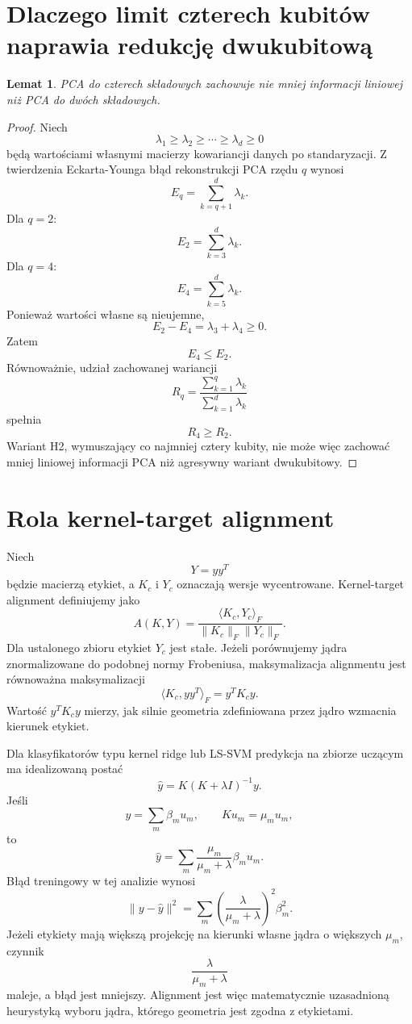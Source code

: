 \documentclass[11pt,a4paper]{article}
\newtheorem{lemma}{Lemat}
\begin{document}
\section{Dlaczego limit czterech kubitów naprawia redukcję dwukubitową}

\begin{lemma}
PCA do czterech składowych zachowuje nie mniej informacji liniowej niż PCA do dwóch składowych.
\end{lemma}

\begin{proof}
Niech
\[
\lambda_1\ge \lambda_2\ge \cdots \ge \lambda_d\ge 0
\]
będą wartościami własnymi macierzy kowariancji danych po standaryzacji. Z twierdzenia Eckarta-Younga błąd rekonstrukcji PCA rzędu $q$ wynosi
\[
E_q=\sum_{k=q+1}^{d}\lambda_k.
\]
Dla $q=2$:
\[
E_2=\sum_{k=3}^{d}\lambda_k.
\]
Dla $q=4$:
\[
E_4=\sum_{k=5}^{d}\lambda_k.
\]
Ponieważ wartości własne są nieujemne,
\[
E_2-E_4=\lambda_3+\lambda_4\ge 0.
\]
Zatem
\[
E_4\le E_2.
\]
Równoważnie, udział zachowanej wariancji
\[
R_q=
\frac{\sum_{k=1}^{q}\lambda_k}
{\sum_{k=1}^{d}\lambda_k}
\]
spełnia
\[
R_4\ge R_2.
\]
Wariant H2, wymuszający co najmniej cztery kubity, nie może więc zachować mniej liniowej informacji PCA niż agresywny wariant dwukubitowy.
\end{proof}

\section{Rola kernel-target alignment}

Niech
\[
Y=yy^T
\]
będzie macierzą etykiet, a $K_c$ i $Y_c$ oznaczają wersje wycentrowane. Kernel-target alignment definiujemy jako
\[
A(K,Y)
=
\frac{\langle K_c,Y_c\rangle_F}
{\|K_c\|_F\|Y_c\|_F}.
\]
Dla ustalonego zbioru etykiet $Y_c$ jest stałe. Jeżeli porównujemy jądra znormalizowane do podobnej normy Frobeniusa, maksymalizacja alignmentu jest równoważna maksymalizacji
\[
\langle K_c,yy^T\rangle_F
=
y^T K_c y.
\]
Wartość $y^T K_c y$ mierzy, jak silnie geometria zdefiniowana przez jądro wzmacnia kierunek etykiet.

Dla klasyfikatorów typu kernel ridge lub LS-SVM predykcja na zbiorze uczącym ma idealizowaną postać
\[
\hat y = K(K+\lambda I)^{-1}y.
\]
Jeśli
\[
y=\sum_m \beta_m u_m,\qquad Ku_m=\mu_m u_m,
\]
to
\[
\hat y
=
\sum_m
\frac{\mu_m}{\mu_m+\lambda}
\beta_m u_m.
\]
Błąd treningowy w tej analizie wynosi
\[
\|y-\hat y\|^2
=
\sum_m
\left(
\frac{\lambda}{\mu_m+\lambda}
\right)^2
\beta_m^2.
\]
Jeżeli etykiety mają większą projekcję na kierunki własne jądra o większych $\mu_m$, czynnik
\[
\frac{\lambda}{\mu_m+\lambda}
\]
maleje, a błąd jest mniejszy. Alignment jest więc matematycznie uzasadnioną heurystyką wyboru jądra, którego geometria jest zgodna z etykietami.
\end{document}
